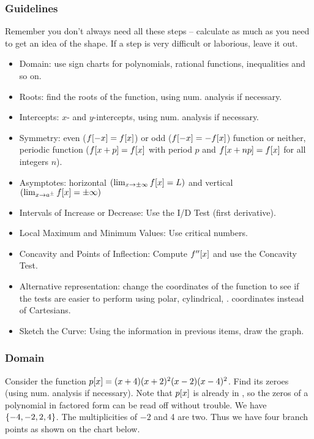 \subsubsection{Guidelines}
Remember you don't always need all these steps -- calculate as much as you need to get an idea of the shape. If a step is very difficult or laborious, leave it out.
%
\begin{itemize}
%
\item Domain: use sign charts for polynomials, rational functions, inequalities and so on.
%
\item Roots: find the roots of the function, using num. analysis if necessary.
%
\item Intercepts: $x$- and $y$-intercepts, using num. analysis if necessary.
%
\item Symmetry: even ($f\!\left[{-x}\right] = f\!\left[{x}\right]$) or odd ($f\!\left[{-x}\right] = -f\!\left[{x}\right]$) function or neither, periodic function ($f\!\left[{x + p}\right] = f\!\left[{x}\right]$ with period $p$ and $f\!\left[{x + np}\right] = f\!\left[{x}\right]$ for all integers $n$).
%
\item Asymptotes: horizontal $\left(\lim_{x\to\pm\infty}f\!\left[{x}\right] = L \right)$ and vertical $\left(\lim_{x\to a^{\pm}}f\!\left[{x}\right] = \pm\infty \right)$
%
\item Intervals of Increase or Decrease: Use the I/D Test (first derivative).
%
\item Local Maximum and Minimum Values: Use critical numbers.
%
\item Concavity and Points of Inflection: Compute $f''\!\left[{x}\right]$ and use the Concavity Test. 
%
\item Alternative representation: change the coordinates of the function to see if the tests are easier to perform using polar, cylindrical, \etc. coordinates instead of Cartesians.
%
\item Sketch the Curve: Using the information in previous items, draw the graph.
%
\end{itemize}


\subsubsection{Domain}
Consider the function $p\!\left[{x}\right] = (x+4)(x+2)^2(x-2)(x-4)^2$. Find its zeroes (using num. analysis if necessary). Note that $p\!\left[{x}\right]$ is already in , so the zeros of a polynomial in factored form can be read off without trouble. We have $\left\lbrace{-4,-2,2,4}\right\rbrace$. The multiplicities of $-2$ and 4 are two. Thus we have four branch points as shown on the chart below.

